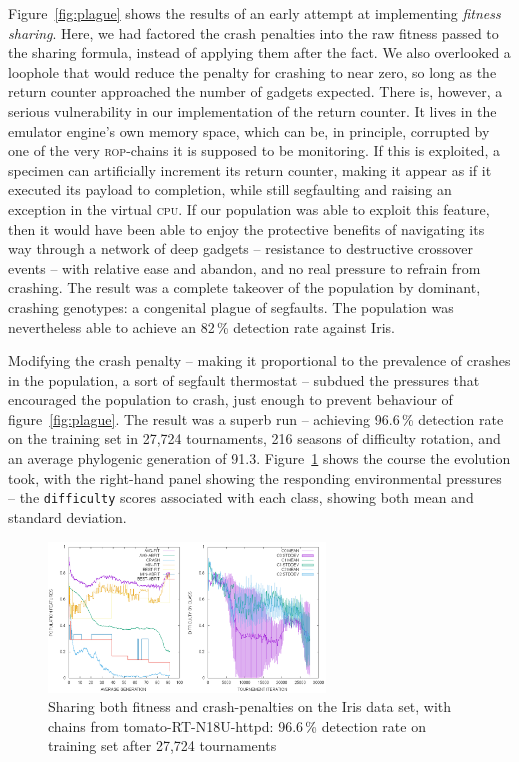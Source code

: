 Figure~\ref{fig:plague} shows the results of an early attempt at
implementing \textit{fitness sharing}. Here, we had factored the crash
penalties into the raw fitness passed to the sharing formula,
instead of applying them after the fact. We also overlooked a
loophole that would reduce the penalty for crashing to near zero,
so long as the return counter approached the number of gadgets
expected. There is, however, a serious vulnerability in our
implementation of the return counter. It lives in the emulator engine's
own memory space, which can be, in principle, corrupted by one of
the very \textsc{rop}-chains it is supposed to be monitoring. If
this is exploited, a specimen can artificially increment its
return counter, making it appear as if it executed its payload to
completion, while still segfaulting and raising an exception in
the virtual \textsc{cpu}. If our population was able to exploit
this feature, then it would have been able to enjoy the
protective benefits of navigating its way through a network of
deep gadgets -- resistance to destructive crossover events --
with relative ease and abandon, and no real pressure to refrain
from crashing. The result was a complete takeover of the
population by dominant, crashing genotypes: a congenital plague of
segfaults. The population was nevertheless able to achieve an 82\,\%
detection rate against Iris. 

Modifying the crash penalty -- making it proportional to the
prevalence of crashes in the population, a sort of segfault
thermostat -- subdued the
pressures that encouraged the population to crash, just enough to
prevent behaviour of figure~\ref{fig:plague}.
The result was a superb run -- achieving 96.6\,\% detection rate on
the training set in 27,724 tournaments, 216 seasons of
difficulty rotation, and an average
phylogenic generation of 91.3. Figure~\ref{fig:okay} shows the
course the evolution took, with the right-hand panel showing the
responding environmental pressures -- the \texttt{difficulty}
scores associated
with each class, showing both mean and standard deviation.


\begin{figure}
  \includegraphics[height=4cm,width=\columnwidth]{examples/iris/sharing3/sharing3white.png}
  \caption{Sharing both fitness and crash-penalties on the Iris
  data set, with chains from tomato-RT-N18U-httpd: 96.6\,\%
  detection rate on training set after 27,724 tournaments}
  \label{fig:okay}
\end{figure}


